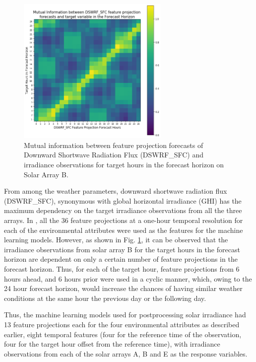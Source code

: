 \begin{figure}[htbp]
    \begin{center}
    	\includegraphics[width=0.65\textwidth]{chapter3/fig_mi_forecast_target.png}
    	\caption[Mutual information between Downward Shortwave Radiation Flux feature projection forecasts and irradiance observations for target hours in the forecast horizon from Solar Array B]{Mutual information between feature projection forecasts of Downward Shortwave Radiation Flux (DSWRF\_SFC) and irradiance observations for target hours in the forecast horizon on Solar Array B.}
    	\label{fig:fig_mi_forecast_target}
    \end{center}
\end{figure}

From among the weather parameters, downward shortwave radiation flux (DSWRF\_SFC), synonymous with global horizontal irradiance (GHI) has the maximum dependency on the target irradiance observations from all the three arrays. In \cite{thesis_zach}, all the 36 feature projections at a one-hour temporal resolution for each of the environmental attributes were used as the features for the machine learning models. However, as shown in Fig. \ref{fig:fig_mi_forecast_target}, it can be observed that the irradiance observations from solar array B for the target hours in the forecast horizon are dependent on only a certain number of feature projections in the forecast horizon. Thus, for each of the target hour, feature projections from 6 hours ahead, and 6 hours prior were used in a cyclic manner, which, owing to the 24 hour forecast horizon, would increase the chances of having similar weather conditions at the same hour the previous day or the following day.

Thus, the machine learning models used for postprocessing solar irradiance had 13 feature projections each for the four environmental attributes as described earlier, eight temporal features (four for the reference time of the observation, four for the target hour offset from the reference time), with irradiance observations from each of the solar arrays A, B and E as the response variables. 




